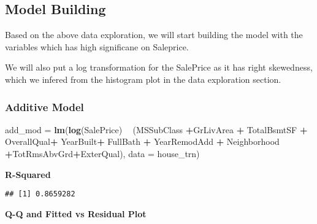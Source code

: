 \documentclass[]{article}
\newenvironment{Shaded}{\begin{snugshade}}{\end{snugshade}}
\newcommand{\KeywordTok}[1]{\textcolor[rgb]{0.13,0.29,0.53}{\textbf{#1}}}
\newcommand{\DataTypeTok}[1]{\textcolor[rgb]{0.13,0.29,0.53}{#1}}
\newcommand{\StringTok}[1]{\textcolor[rgb]{0.31,0.60,0.02}{#1}}
\newcommand{\OperatorTok}[1]{\textcolor[rgb]{0.81,0.36,0.00}{\textbf{#1}}}
\newcommand{\NormalTok}[1]{#1}
\begin{document}
\subsection{Model Building}\label{model-building}

Based on the above data exploration, we will start building the model
with the variables which has high significane on Saleprice.

We will also put a log transformation for the SalePrice as it has right
skewedness, which we infered from the histogram plot in the data
exploration section.

\subsubsection{Additive Model}\label{additive-model}

\begin{Shaded}
\begin{Highlighting}[]
\NormalTok{add_mod =}\StringTok{ }\KeywordTok{lm}\NormalTok{(}\KeywordTok{log}\NormalTok{(SalePrice) }\OperatorTok{~}\StringTok{  }\NormalTok{(MSSubClass }\OperatorTok{+}\NormalTok{GrLivArea }\OperatorTok{+}\StringTok{ }\NormalTok{TotalBsmtSF }\OperatorTok{+}\StringTok{ }\NormalTok{OverallQual}\OperatorTok{+}\StringTok{ }\NormalTok{YearBuilt}\OperatorTok{+}\StringTok{ }\NormalTok{FullBath }\OperatorTok{+}\StringTok{ }\NormalTok{YearRemodAdd }\OperatorTok{+}\StringTok{ }\NormalTok{Neighborhood }\OperatorTok{+}\NormalTok{TotRmsAbvGrd}\OperatorTok{+}\NormalTok{ExterQual), }\DataTypeTok{data =}\NormalTok{ house_trn)}
\end{Highlighting}
\end{Shaded}

\textbf{R-Squared}

\begin{Shaded}
\end{Shaded}

\begin{verbatim}
## [1] 0.8659282
\end{verbatim}

\textbf{Q-Q and Fitted vs Residual Plot}
\end{document}

